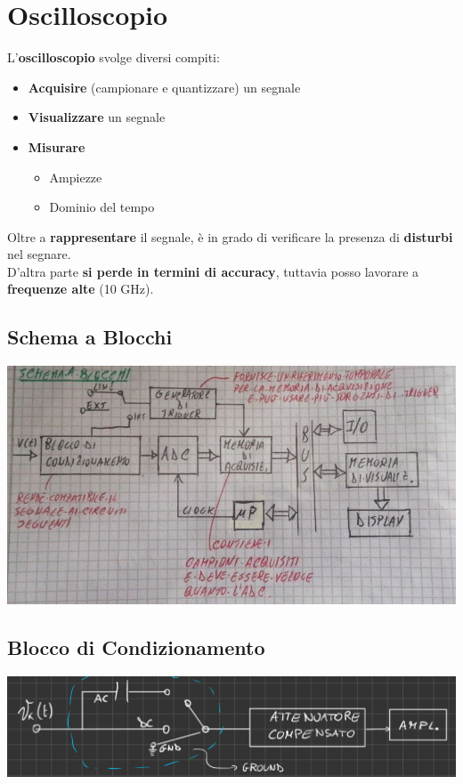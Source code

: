 \chapter{Oscilloscopio}
L'\textbf{oscilloscopio} svolge diversi compiti:
\begin{itemize}
    \item \textbf{Acquisire} (campionare  e quantizzare) un segnale
    \item \textbf{Visualizzare} un segnale
    \item \textbf{Misurare}
    \begin{itemize}
        \item Ampiezze
        \item Dominio del tempo
    \end{itemize}
\end{itemize}
Oltre a \textbf{rappresentare} il segnale, è in grado di verificare la presenza di \textbf{disturbi} nel segnare.\\
D'altra parte \textbf{si perde in termini di accuracy}, tuttavia posso lavorare a \textbf{frequenze alte} (10 GHz).
\section{Schema a Blocchi}
\begin{center}
    \includegraphics[width=\textwidth]{Images/figure14.jpg}
\end{center}
\section{Blocco di Condizionamento}
\begin{center}
    \includegraphics[width=\textwidth]{Images/figure15.png}
\end{center}
